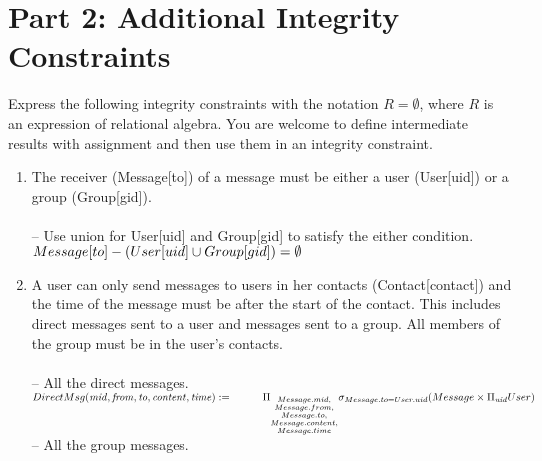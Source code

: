\documentclass{article}
\newcommand{\var}[1]{\mathit{#1}}
\begin{document}
\section*{Part 2: Additional Integrity Constraints}


Express the following integrity constraints
with the notation $R = \emptyset$, where $R$ is an expression of relational algebra. 
You are welcome to define intermediate results with assignment
and then use them in an integrity constraint.

\begin{enumerate}

\item   %
The receiver (Message[to]) of a message must be either a user (User[uid]) or a group (Group[gid]). \\\\ [5pt]
\large{
\hspace*{1cm} -- Use union for User[uid] and Group[gid] to satisfy the either condition.\\ [5pt]
$
Message[to] - (User[uid] \cup Group[gid]) =  \emptyset \\[5pt]
$
}
\item %
A user can only send messages to users in her contacts (Contact[contact]) and the time of the message must be after the start of the contact. This includes direct messages sent to a user and messages sent to a group. All members of the group must be in the user's contacts. \\\\ [5pt]
\large{
\hspace*{1cm} -- All the direct messages. \\ [5pt]
$
DirectMsg(\var{mid}, \var{from}, \var{to}, \var{content}, \var{time}) := \\ [5pt]
\hspace*{1cm} \Pi_{\substack{Message.mid, \\
							Message.from, \\
							Message.to, \\
							Message.content, \\
							Message.time}}
			\sigma_{Message.to = User.uid}
			(Message \times \Pi_{\var{uid}} User) \\\\\\ [5pt]
$
\hspace*{1cm} -- All the group messages. \\ [5pt]
}
\end{enumerate}
\end{document}
